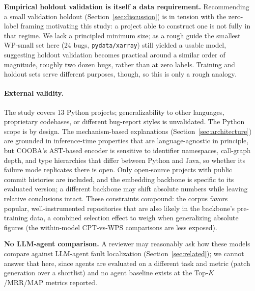 \documentclass[a4paper,fleqn]{cas-dc}
\begin{document}
\textbf{Empirical holdout validation is itself a data requirement.}
Recommending a small validation holdout (Section~\ref{sec:discussion}) is in
tension with the zero-label framing motivating this study: a project able to
construct one is not fully in that regime. We lack a principled minimum
size; as a rough guide the smallest WP-small set here (24 bugs,
\texttt{pydata/xarray}) still yielded a usable model, suggesting holdout
validation becomes practical around a similar order of magnitude, roughly two
dozen bugs, rather than at zero labels. Training and holdout sets
serve different purposes, though, so this is only a rough analogy.

\paragraph{External validity.}
The study covers 13 Python projects; generalizability to other languages,
proprietary codebases, or different bug-report styles is unvalidated. The
Python scope is by design. The mechanism-based explanations
(Section~\ref{sec:architecture}) are grounded in inference-time properties
that are language-agnostic in principle, but COOBA's AST-based encoder is
sensitive to identifier namespaces, call-graph depth, and type hierarchies
that differ between Python and Java, so whether its failure mode replicates
there is open. Only open-source projects with public commit histories are
included, and the embedding backbone is specific to its evaluated version; a
different backbone may shift absolute numbers while leaving relative
conclusions intact. These constraints compound: the corpus favors popular,
well-instrumented repositories that are also likely in the backbone's
pre-training data, a combined selection effect to weigh when generalizing
absolute figures (the within-model CPT-vs-WPS comparisons are less exposed).

\textbf{No LLM-agent comparison.} A reviewer may reasonably ask how these
models compare against LLM-agent fault localization
(Section~\ref{sec:related}); we cannot answer that here, since agents are
evaluated on a different task and metric (patch generation over a shortlist)
and no agent baseline exists at the Top-$K$/MRR/MAP metrics reported.
\end{document}
